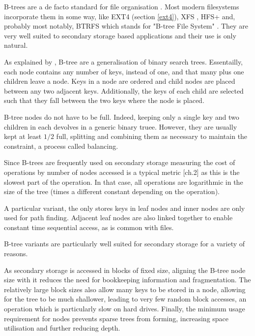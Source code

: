        B-trees are a de facto standard for file organisation
        \cite{btree_ubiquitous}. Most modern filesystems incorporate them in
        some way, like EXT4 (section \ref{ext4}), XFS \cite{xfs_scalability},
        HFS+ \cite{see notes} and, probably most notably, BTRFS which stands
        for "B-tree File System" \cite{the wiki?}. They are very well suited to
        secondary storage based applications and their use is only natural.

        As explained by \citeauthor{btree_ubiquitous}, B-tree are a
        generalisation of binary search trees. Essentailly, each node contains
        any number of keys, instead of one, and that many plus one children
        leave a node. Keys in a node are ordered and child nodes are placed
        between any two adjacent keys. Additionally, the keys of each child are
        selected such that they fall between the two keys where the node is
        placed. %

        B-tree nodes do not have to be full. Indeed, keeping only a single key
        and two children in each devolves in a generic binary truee. However,
        they are usually kept at least $1/2$ full, splitting and combining them
        as necessary to maintain the constraint, a process called balancing.

        Since B-trees are frequently used on secondary storage measuring the
        cost of operations by number of nodes accessed is a typical metric
        \cite{btree_ubiquitous}[ch.2] as this is the slowest part of the
        operation. In that case, all operations are logarithmic in the size of
        the tree (times a different constant depending on the operation).

        A particular variant, the \bplustree only stores keys in leaf nodes and
        inner nodes are only used for path finding. Adjacent leaf nodes are
        also linked together to enable constant time sequential access, as is
        common with files.

        B-tree variants are particularly well suited for secondary storage for
        a variety of reasons.

        As secondary storage is accessed in blocks of fixed size, aligning the
        B-tree node size with it reduces the need for bookkeeping information
        and fragmentation. The relatively large block sizes also allow many
        keys to be stored in a node, allowing for the tree to be much
        shallower, leading to very few random block accesses, an operation
        which is particularly slow on hard drives. Finally, the minimum usage
        requirement for nodes prevents sparse trees from forming, increasing
        space utilisation and further reducing depth.

